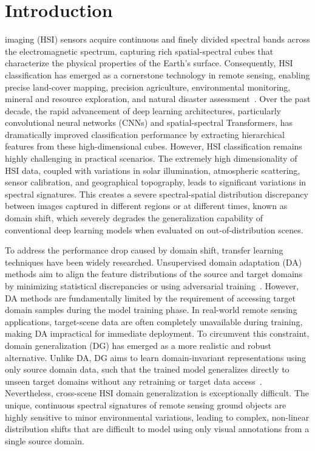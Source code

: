 \section{Introduction}
\label{sec:intro}

 imaging (HSI) sensors acquire continuous and finely divided spectral bands across the electromagnetic spectrum, capturing rich spatial-spectral cubes that characterize the physical properties of the Earth's surface. Consequently, HSI classification has emerged as a cornerstone technology in remote sensing, enabling precise land-cover mapping, precision agriculture, environmental monitoring, mineral and resource exploration, and natural disaster assessment~\cite{he2017deep}. Over the past decade, the rapid advancement of deep learning architectures, particularly convolutional neural networks (CNNs) and spatial-spectral Transformers, has dramatically improved classification performance by extracting hierarchical features from these high-dimensional cubes. However, HSI classification remains highly challenging in practical scenarios. The extremely high dimensionality of HSI data, coupled with variations in solar illumination, atmospheric scattering, sensor calibration, and geographical topography, leads to significant variations in spectral signatures. This creates a severe spectral-spatial distribution discrepancy between images captured in different regions or at different times, known as domain shift, which severely degrades the generalization capability of conventional deep learning models when evaluated on out-of-distribution scenes.

To address the performance drop caused by domain shift, transfer learning techniques have been widely researched. Unsupervised domain adaptation (DA) methods aim to align the feature distributions of the source and target domains by minimizing statistical discrepancies or using adversarial training~\cite{ehsnet2023}. However, DA methods are fundamentally limited by the requirement of accessing target domain samples during the model training phase. In real-world remote sensing applications, target-scene data are often completely unavailable during training, making DA impractical for immediate deployment. To circumvent this constraint, domain generalization (DG) has emerged as a more realistic and robust alternative. Unlike DA, DG aims to learn domain-invariant representations using only source domain data, such that the trained model generalizes directly to unseen target domains without any retraining or target data access~\cite{wang2022domain}. Nevertheless, cross-scene HSI domain generalization is exceptionally difficult. The unique, continuous spectral signatures of remote sensing ground objects are highly sensitive to minor environmental variations, leading to complex, non-linear distribution shifts that are difficult to model using only visual annotations from a single source domain.

